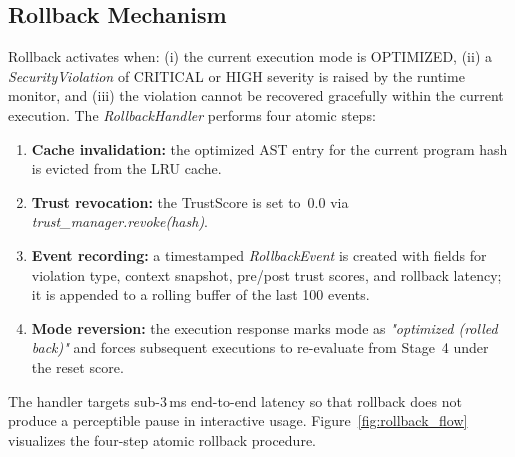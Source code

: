 \documentclass[conference]{IEEEtran}
\begin{document}
\subsection{Rollback Mechanism}

Rollback activates when: (i) the current execution mode is
OPTIMIZED, (ii) a \textit{SecurityViolation} of CRITICAL or HIGH
severity is raised by the runtime monitor, and (iii) the violation
cannot be recovered gracefully within the current execution. The
\textit{RollbackHandler} performs four atomic steps:

\begin{enumerate}
  \item \textbf{Cache invalidation:} the optimized AST entry for
        the current program hash is evicted from the LRU cache.
  \item \textbf{Trust revocation:} the TrustScore is set to~0.0
        via \textit{trust\_manager.revoke(hash)}.
  \item \textbf{Event recording:} a timestamped
        \textit{RollbackEvent} is created with fields for
        violation type, context snapshot, pre/post trust scores,
        and rollback latency; it is appended to a rolling buffer
        of the last 100 events.
  \item \textbf{Mode reversion:} the execution response marks
        mode as \textit{"optimized (rolled back)"} and forces
        subsequent executions to re-evaluate from Stage~4 under
        the reset score.
\end{enumerate}

The handler targets sub-3\,ms end-to-end latency so that rollback
does not produce a perceptible pause in interactive usage.
Figure~\ref{fig:rollback_flow} visualizes the four-step atomic
rollback procedure.
\end{document}
